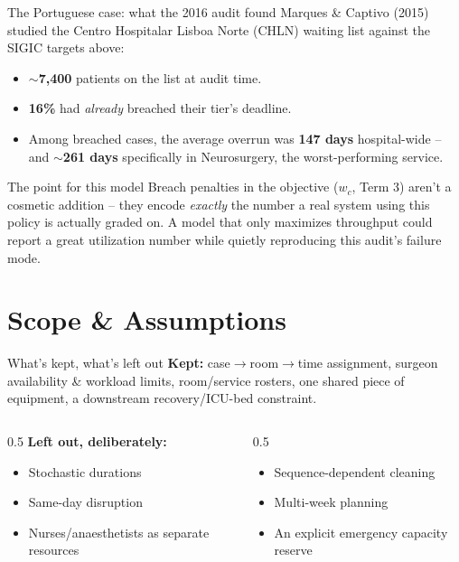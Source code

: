 \documentclass[aspectratio=169]{beamer}
\newcommand{\backbutton}{%
  \hfill\hyperlink{toc}{\beamerreturnbutton{Agenda}}%
}
\begin{document}
\begin{frame}{The Portuguese case: what the 2016 audit found}
  Marques \& Captivo (2015) studied the Centro Hospitalar Lisboa Norte
  (CHLN) waiting list against the SIGIC targets above:
  \begin{itemize}
    \item $\sim$\textbf{7{,}400} patients on the list at audit time.
    \item \textbf{16\%} had \emph{already} breached their tier's deadline.
    \item Among breached cases, the average overrun was \textbf{147 days}
      hospital-wide -- and \textbf{$\sim$261 days} specifically in
      Neurosurgery, the worst-performing service.
  \end{itemize}
  \pause
  \begin{block}{The point for this model}
    Breach penalties in the objective ($w_c$, Term 3) aren't a cosmetic
    addition -- they encode \emph{exactly} the number a real system using
    this policy is actually graded on. A model that only maximizes
    throughput could report a great utilization number while quietly
    reproducing this audit's failure mode.
  \end{block}
\end{frame}

\section{Scope \& Assumptions}

\begin{frame}{What's kept, what's left out}
  \textbf{Kept:} case$\to$room$\to$time assignment, surgeon availability \&
  workload limits, room/service rosters, one shared piece of equipment, a
  downstream recovery/ICU-bed constraint.
  \vspace{0.5em}
  \begin{columns}
    \begin{column}{0.5\textwidth}
      \textbf{Left out, deliberately:}
      \begin{itemize}
        \footnotesize
        \item Stochastic durations
        \item Same-day disruption
        \item Nurses/anaesthetists as separate resources
      \end{itemize}
    \end{column}
    \begin{column}{0.5\textwidth}
      \begin{itemize}
        \footnotesize
        \item Sequence-dependent cleaning
        \item Multi-week planning
        \item An explicit emergency capacity reserve
      \end{itemize}
    \end{column}
  \end{columns}
  \backbutton
\end{frame}
\end{document}
